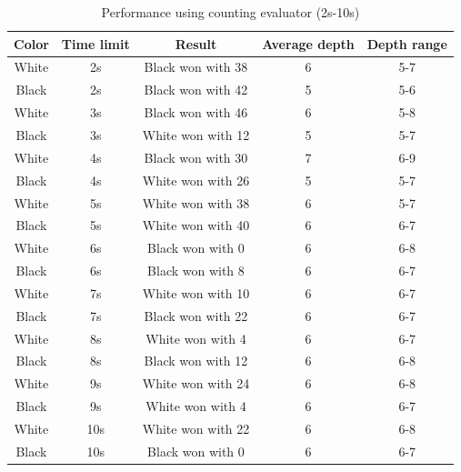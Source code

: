 \documentclass[10pt, titlepage, oneside, a4paper]{article}
\begin{document}
\begin{table}[H]
    \centering
    \caption{Performance using counting evaluator (2s-10s)}
    \begin{tabular}{ccccc}
    \hline
    \textbf{Color} & \textbf{Time limit} & \textbf{Result} & \textbf{Average depth} & \textbf{Depth range} \\
    \hline
    White & 2s & Black won with 38 & 6 & 5-7\\
    Black & 2s & Black won with 42 & 5 & 5-6\\
    White & 3s & Black won with 46 & 6 & 5-8\\
    Black & 3s & White won with 12 & 5 & 5-7\\
    White & 4s & Black won with 30 & 7 & 6-9\\
    Black & 4s & White won with 26 & 5 & 5-7\\
    White & 5s & White won with 38 & 6 & 5-7\\
    Black & 5s & White won with 40 & 6 & 6-7\\
    White & 6s & Black won with 0 & 6 & 6-8\\
    Black & 6s & Black won with 8 & 6 & 6-7\\
    White & 7s & White won with 10 & 6 & 6-7\\
    Black & 7s & Black won with 22 & 6 & 6-7\\
    White & 8s & White won with 4 & 6 & 6-7\\
    Black & 8s & Black won with 12 & 6 & 6-8\\
    White & 9s & White won with 24 & 6 & 6-8\\
    Black & 9s & White won with 4 & 6 & 6-7\\
    White & 10s & White won with 22 & 6 & 6-8\\
    Black & 10s & Black won with 0 & 6 & 6-7\\
    \hline
    \end{tabular}    
    \label{tab:counting-results}
\end{table}
\end{document}
